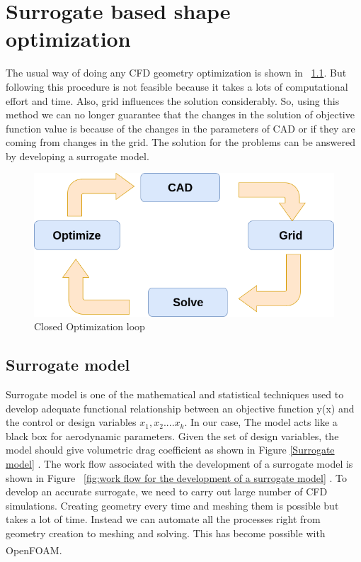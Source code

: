 \chapter{Surrogate based shape optimization}
\label{optimization}
The usual way of doing any CFD geometry optimization is shown in ~\ref{Closed Optimization loop}. But following this procedure is not feasible because it takes a lots of computational effort and time. Also, grid influences the solution considerably. So, using this method we can no longer guarantee that the changes in the solution of objective function value is because of the changes in the parameters of CAD or if they are coming from changes in the grid. The solution for the problems can be answered by developing a surrogate model.
\begin{figure}[H]
	\includegraphics[width=\textwidth]{optimization/closed_loop.png}
	\caption{Closed Optimization loop}
	\label{Closed Optimization loop} %
\end{figure}

\section{Surrogate model}

 Surrogate model is one of the mathematical and statistical techniques used to develop adequate functional relationship between an objective function y(x) and the control or design variables $ x_1 , x_2 .... x_k $. In our case, The model acts like a black box for aerodynamic parameters. Given the set of design variables, the model should give volumetric drag coefficient as shown in Figure \ref{Surrogate model} . The work flow associated with the development of a surrogate model is shown in Figure ~\ref{fig:work flow for the development of a surrogate model} . To develop an accurate surrogate, we need to carry out large number of CFD simulations. Creating geometry every time and meshing them is possible but takes a lot of time. Instead we can automate all the processes right from geometry creation to meshing and solving. This has become possible with OpenFOAM\textsuperscript{\textregistered}.

